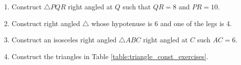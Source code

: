 \begin{enumerate}[label=\arabic*.,ref=\thesubsection.\theenumi]
\item Construct  $\triangle PQR$ right angled at $Q$ such that $QR = 8$ and $PR = 10$.
\item Construct  right angled $\triangle $ whose hypotenuse  is 6 and one of the legs is 4.
\item Construct  an isosceles right angled $\triangle ABC$ right angled at $C$ such $AC = 6$.
\item Construct the  triangles in Table \ref{table:triangle_const_exercises}.
\begin{table}[!ht]

\caption{}
\label{table:triangle_const_exercises}
\end{table}

\end{enumerate}
%
